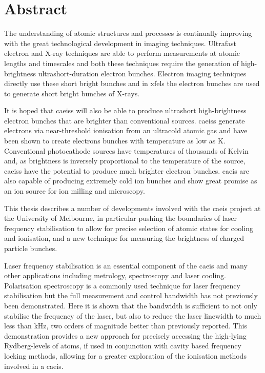 \chapter*{Abstract}

The understanding of atomic structures and processes is continually improving with the great technological development in imaging techniques.
Ultrafast electron and X-ray techniques are able to perform measurements at atomic lengths and timescales and both these techniques require the generation of high-brightness ultrashort-duration electron bunches.
Electron imaging techniques directly use these short bright bunches and in \glspl{xfel} the electron bunches are used to generate short bright bunches of X-rays.

It is hoped that \glspl{caeis} will also be able to produce ultrashort high-brightness electron bunches that are brighter than conventional sources.
\Glspl{caeis} generate electrons via near-threshold ionisation from an ultracold atomic gas and have been shown to create electrons bunches with temperature as low as \unit[10]{K}.
Conventional photocathode sources have temperatures of thousands of Kelvin and, as brightness is inversely proportional to the temperature of the source, \glspl{caeis} have the potential to produce much brighter electron bunches.
\Gls{caeis} are also capable of producing extremely cold ion bunches and show great promise as an ion source for ion milling and microscopy.

This thesis describes a number of developments involved with the \gls{caeis} project at the University of Melbourne, in particular pushing the boundaries of laser frequency stabilisation to allow for precise selection of atomic states for cooling and ionisation, and a new technique for measuring the brightness of charged particle bunches.

Laser frequency stabilisation is an essential component of the \gls{caeis} and many other applications including metrology, spectroscopy and laser cooling.
Polarisation spectroscopy is a commonly used technique for laser frequency stabilisation but the full measurement and control bandwidth has not previously been demonstrated.
Here it is shown that the bandwidth is sufficient to not only stabilise the frequency of the laser, but also to reduce the laser linewidth to much less than \unit[1]{kHz}, two orders of magnitude better than previously reported.
This demonstration provides a new approach for precisely accessing the high-lying Rydberg-levels of atoms, if used in conjunction with cavity based frequency locking methods, allowing for a greater exploration of the ionisation methods involved in a \gls{caeis}.

